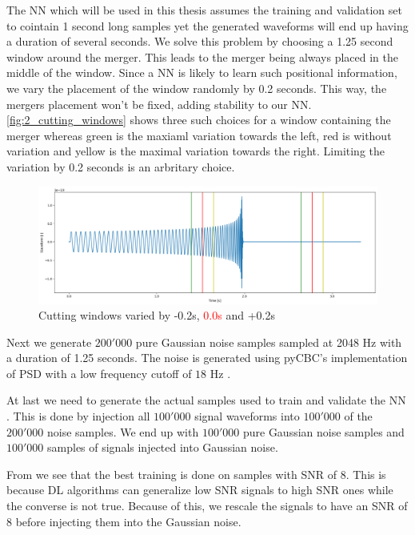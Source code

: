 The NN which will be used in this thesis \cite{PhysRevD.105.043002} assumes
the training and validation set to cointain 1 second long samples yet the 
generated waveforms will end up having 
a duration of several seconds. We solve this problem by choosing a 1.25 second
window around the merger. This leads to the merger being always placed in
the middle of the window. Since a NN is likely to learn such positional
information, we vary the placement of the window randomly by 0.2
seconds. This way, the mergers placement won't be fixed, adding stability to our
NN. \autoref{fig:2_cutting_windows} shows three such choices for a
window containing the merger whereas green is the maxiaml variation towards the
left, red is without variation and yellow is the maximal variation towards the
right. Limiting the variation by 0.2 seconds is an arbritary choice.

\begin{figure}[t]
  \includegraphics[width=\textwidth]{img/2_data_generation/chapter2_cutting_window.png}
  \caption{Cutting windows varied by \textcolor{green!40!black}{-0.2s},
    \textcolor{red}{0.0s} and \textcolor{yellow!60!black}{+0.2s}}
  \label{fig:2_cutting_windows}
  \centering
\end{figure}

Next we generate $200'000$ pure Gaussian noise samples sampled at 2048 Hz with
a duration of 1.25 seconds.
The noise is generated using pyCBC's implementation of
 PSD with a low frequency cutoff of $18$ Hz
\cite{PhysRevD.105.043002} \cite{MLGWSC1}.

At last we need to generate the actual samples used to train and validate the NN
. This is done by injection all $100'000$ signal waveforms into $100'000$ of the
$200'000$ noise samples. We end up with $100'000$ pure Gaussian noise samples
and $100'000$ samples of signals injected into Gaussian noise.

From \cite{PhysRevD.105.043002} we see that the best training is done on samples
with SNR
of 8. This is because DL algorithms can generalize low SNR signals to high SNR
ones while the converse is not true. \cite{PhysRevD.105.043002} 
Because of this, we rescale
the signals to have an SNR of 8 before injecting them into the Gaussian noise.

